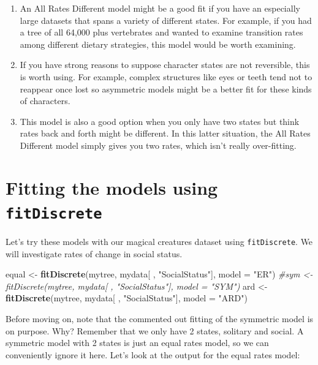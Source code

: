 \documentclass[]{book}
\newenvironment{Shaded}{\begin{snugshade}}{\end{snugshade}}
\newcommand{\KeywordTok}[1]{\textcolor[rgb]{0.13,0.29,0.53}{\textbf{{#1}}}}
\newcommand{\DataTypeTok}[1]{\textcolor[rgb]{0.13,0.29,0.53}{{#1}}}
\newcommand{\StringTok}[1]{\textcolor[rgb]{0.31,0.60,0.02}{{#1}}}
\newcommand{\CommentTok}[1]{\textcolor[rgb]{0.56,0.35,0.01}{\textit{{#1}}}}
\newcommand{\NormalTok}[1]{{#1}}
\providecommand{\tightlist}{%
  \setlength{\itemsep}{0pt}\setlength{\parskip}{0pt}}
\begin{document}
\begin{enumerate}
\def\labelenumi{\arabic{enumi}.}
\tightlist
\item
  An All Rates Different model might be a good fit if you have an
  especially large datasets that spans a variety of different states.
  For example, if you had a tree of all 64,000 plus vertebrates and
  wanted to examine transition rates among different dietary strategies,
  this model would be worth examining.
\item
  If you have strong reasons to suppose character states are not
  reversible, this is worth using. For example, complex structures like
  eyes or teeth tend not to reappear once lost so asymmetric models
  might be a better fit for these kinds of characters.
\item
  This model is also a good option when you only have two states but
  think rates back and forth might be different. In this latter
  situation, the All Rates Different model simply gives you two rates,
  which isn't really over-fitting.
\end{enumerate}

\section{\texorpdfstring{Fitting the models using
\texttt{fitDiscrete}}{Fitting the models using fitDiscrete}}\label{fitting-the-models-using-fitdiscrete}

Let's try these models with our magical creatures dataset using
\texttt{fitDiscrete}. We will investigate rates of change in social
status.

\begin{Shaded}
\begin{Highlighting}[]
\NormalTok{equal <-}\StringTok{ }\KeywordTok{fitDiscrete}\NormalTok{(mytree, mydata[ , }\StringTok{"SocialStatus"}\NormalTok{], }\DataTypeTok{model =} \StringTok{"ER"}\NormalTok{)}
\CommentTok{#sym <- fitDiscrete(mytree, mydata[ , "SocialStatus"], model = "SYM")}
\NormalTok{ard <-}\StringTok{ }\KeywordTok{fitDiscrete}\NormalTok{(mytree, mydata[ , }\StringTok{"SocialStatus"}\NormalTok{], }\DataTypeTok{model =} \StringTok{"ARD"}\NormalTok{)}
\end{Highlighting}
\end{Shaded}

Before moving on, note that the commented out fitting of the symmetric
model is on purpose. Why? Remember that we only have 2 states, solitary
and social. A symmetric model with 2 states is just an equal rates
model, so we can conveniently ignore it here. Let's look at the output
for the equal rates model:
\end{document}

